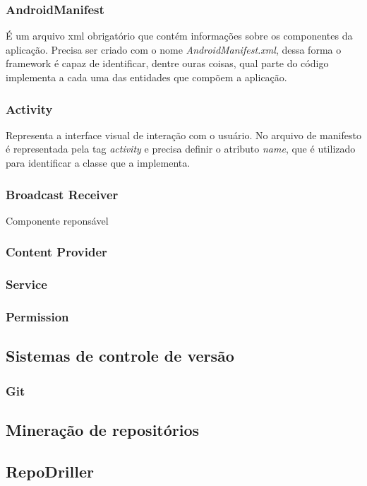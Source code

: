 \documentclass[a4paper,12pt]{article}
\numberwithin{figure}{section}
\begin{document}
\subsubsection{AndroidManifest}
É um arquivo xml obrigatório que contém informações sobre os componentes da aplicação. Precisa ser criado com o nome \textit{AndroidManifest.xml}, dessa forma o framework é capaz de identificar, dentre ouras coisas, qual parte do código implementa a cada uma das entidades que compõem a aplicação.

\subsubsection{Activity}
Representa a interface visual de interação com o usuário. No arquivo de manifesto é representada pela tag \textit{activity} e precisa definir o atributo \textit{name}, que é utilizado para identificar a classe que a implementa.
\subsubsection{Broadcast Receiver}
Componente reponsável 
\subsubsection{Content Provider}

\subsubsection{Service}

\subsubsection{Permission}


\subsection{Sistemas de controle de versão}%
\subsubsection{Git}%
\subsection{Mineração de repositórios}%
\subsection{RepoDriller}%
\cite{repodriller}
\end{document}
